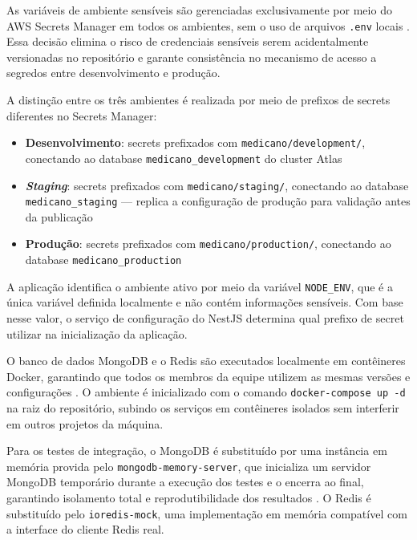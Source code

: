 As variáveis de ambiente sensíveis são gerenciadas
exclusivamente por meio do AWS Secrets Manager em
todos os ambientes, sem o uso de arquivos \texttt{.env}
locais \cite{awssm}. Essa decisão elimina o risco de
credenciais sensíveis serem acidentalmente versionadas
no repositório e garante consistência no mecanismo de
acesso a segredos entre desenvolvimento e produção.

A distinção entre os três ambientes é realizada por
meio de prefixos de secrets diferentes no Secrets
Manager:

\begin{itemize}
  \item \textbf{Desenvolvimento}: secrets prefixados
        com \texttt{medicano/development/}, conectando
        ao database \texttt{medicano\_development} do
        cluster Atlas
  \item \textbf{\textit{Staging}}: secrets prefixados
        com \texttt{medicano/staging/}, conectando ao
        database \texttt{medicano\_staging} — replica
        a configuração de produção para validação
        antes da publicação
  \item \textbf{Produção}: secrets prefixados com
        \texttt{medicano/production/}, conectando ao
        database \texttt{medicano\_production}
\end{itemize}

A aplicação identifica o ambiente ativo por meio da
variável \texttt{NODE\_ENV}, que é a única variável
definida localmente e não contém informações sensíveis.
Com base nesse valor, o serviço de configuração do
NestJS determina qual prefixo de secret utilizar na
inicialização da aplicação.

O banco de dados MongoDB e o Redis são executados
localmente em contêineres Docker, garantindo que
todos os membros da equipe utilizem as mesmas versões
e configurações \cite{docker2024}. O ambiente é
inicializado com o comando
\mbox{\texttt{docker-compose up -d}} na raiz do
repositório, subindo os serviços em contêineres
isolados sem interferir em outros projetos da máquina.

Para os testes de integração, o MongoDB é
substituído por uma instância em memória provida
pelo \texttt{mongodb-memory-server}, que inicializa
um servidor MongoDB temporário durante a execução
dos testes e o encerra ao final, garantindo
isolamento total e reprodutibilidade dos resultados
\cite{jestjs2024}. O Redis é substituído pelo
\texttt{ioredis-mock}, uma implementação em memória
compatível com a interface do cliente Redis real.

